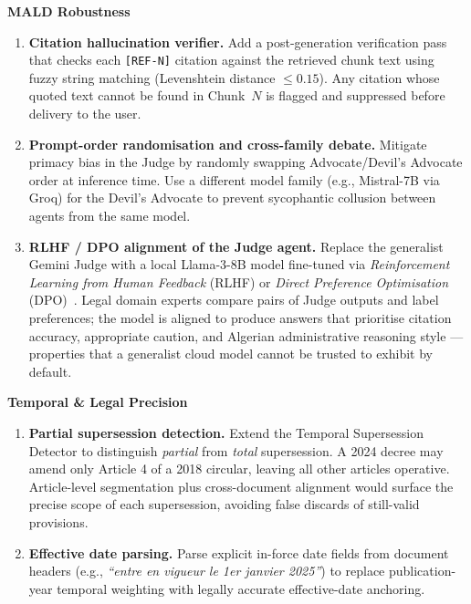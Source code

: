 \documentclass[12pt,a4paper]{article}
\begin{document}
\vspace{6pt}
\noindent\textbf{MALD Robustness}
\begin{enumerate}[leftmargin=*,nosep,resume]

\item \textbf{Citation hallucination verifier.}
Add a post-generation verification pass that checks each \texttt{[REF-N]} citation
against the retrieved chunk text using fuzzy string matching (Levenshtein distance
$\leq 0.15$). Any citation whose quoted text cannot be found in Chunk~$N$ is flagged
and suppressed before delivery to the user.

\item \textbf{Prompt-order randomisation and cross-family debate.}
Mitigate primacy bias in the Judge by randomly swapping Advocate/Devil's Advocate
order at inference time. Use a different model family (e.g., Mistral-7B via Groq)
for the Devil's Advocate to prevent sycophantic collusion between agents from the
same model.

\item \textbf{RLHF / DPO alignment of the Judge agent.}
Replace the generalist Gemini Judge with a local Llama-3-8B model fine-tuned via
\emph{Reinforcement Learning from Human Feedback} (RLHF) or \emph{Direct Preference
Optimisation} (DPO)~\cite{rafailov2023dpo}. Legal domain experts compare pairs of
Judge outputs and label preferences; the model is aligned to produce answers that
prioritise citation accuracy, appropriate caution, and Algerian administrative
reasoning style — properties that a generalist cloud model cannot be trusted to
exhibit by default.

\end{enumerate}

\vspace{6pt}
\noindent\textbf{Temporal \& Legal Precision}
\begin{enumerate}[leftmargin=*,nosep,resume]

\item \textbf{Partial supersession detection.}
Extend the Temporal Supersession Detector to distinguish \emph{partial} from
\emph{total} supersession. A 2024 decree may amend only Article 4 of a 2018
circular, leaving all other articles operative. Article-level segmentation plus
cross-document alignment would surface the precise scope of each supersession,
avoiding false discards of still-valid provisions.

\item \textbf{Effective date parsing.}
Parse explicit in-force date fields from document headers (e.g.,
\textit{``entre en vigueur le 1er janvier 2025''}) to replace publication-year
temporal weighting with legally accurate effective-date anchoring.

\end{enumerate}
\end{document}
